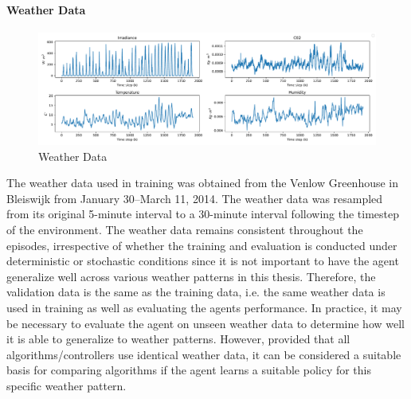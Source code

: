 \paragraph{Weather Data}

\begin{figure}[H]
    \centering
    \includegraphics[width=\textwidth]{figures/weather_data.pdf}
    \caption{Weather Data}
    \label{fig:weather-data}
\end{figure}

The weather data used in training was obtained from the Venlow Greenhouse in Bleiswijk from January 30–March 11, 2014. The weather data was resampled from its original 5-minute interval to a 30-minute interval following the timestep of the environment. The weather data remains consistent throughout the episodes, irrespective of whether the training and evaluation is conducted under deterministic or stochastic conditions since it is not important to have the agent generalize well across various weather patterns in this thesis. Therefore, the validation data is the same as the training data, i.e. the same weather data is used in training as well as evaluating the agents performance. In practice, it may be necessary to evaluate the agent on unseen weather data to determine how well it is able to generalize to weather patterns. However, provided that all algorithms/controllers use identical weather data, it can be considered a suitable basis for comparing algorithms if the agent learns a suitable policy for this specific weather pattern.



